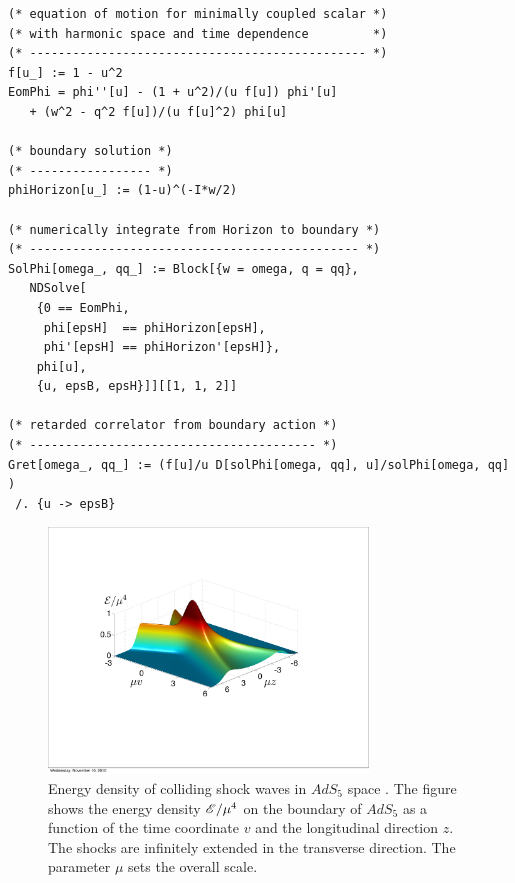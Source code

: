 \vspace*{0.3cm} 
\begin{lstlisting}
(* equation of motion for minimally coupled scalar *)
(* with harmonic space and time dependence         *)
(* ----------------------------------------------- *)
f[u_] := 1 - u^2
EomPhi = phi''[u] - (1 + u^2)/(u f[u]) phi'[u] 
   + (w^2 - q^2 f[u])/(u f[u]^2) phi[u]

(* boundary solution *)
(* ----------------- *)
phiHorizon[u_] := (1-u)^(-I*w/2)

(* numerically integrate from Horizon to boundary *)
(* ---------------------------------------------- *)
SolPhi[omega_, qq_] := Block[{w = omega, q = qq},
   NDSolve[
    {0 == EomPhi,
     phi[epsH]  == phiHorizon[epsH],
     phi'[epsH] == phiHorizon'[epsH]},
    phi[u],
    {u, epsB, epsH}]][[1, 1, 2]]

(* retarded correlator from boundary action *)
(* ---------------------------------------- *)
Gret[omega_, qq_] := (f[u]/u D[solPhi[omega, qq], u]/solPhi[omega, qq] ) 
 /. {u -> epsB}

\end{lstlisting}

\begin{figure}[t!]
\begin{center}
\includegraphics*[width=8.5cm]{Chapter2-figures/EnergyDensity.pdf}
\end{center}
\caption{\label{fig_coll_shocks}
Energy density of colliding shock waves in $AdS_5$ space \cite{Chesler:2010bi}.
The figure shows the energy density ${\cal E}/\mu^4$ on the boundary of 
$AdS_5$ as a function of the time coordinate $v$ and the longitudinal 
direction $z$. The shocks are infinitely extended in the transverse 
direction. The parameter $\mu$ sets the overall scale. }
\end{figure}

